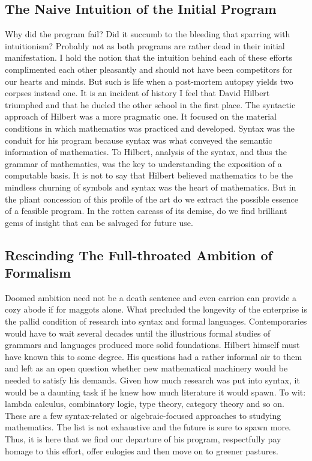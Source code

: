 \subsection{The Naive Intuition of the Initial Program}
Why did the program fail? Did it succumb to the bleeding that sparring with
intuitionism? Probably not as both programs are rather dead in their initial
manifestation. I hold the notion that the intuition behind each of these
efforts complimented each other pleasantly and should not have been competitors
for our hearts and minds. But such is life when a post-mortem autopsy yields
two corpses instead one. It is an incident of history I feel that David Hilbert
triumphed and that he dueled the other school in the first place. The syntactic
approach of Hilbert was a more pragmatic one. It focused on the material
conditions in which mathematics was practiced and developed. Syntax was the
conduit for his program because syntax was what conveyed the semantic
information of mathematics. To Hilbert, analysis of the syntax, and thus the
grammar of mathematics, was the key to understanding the exposition of a
computable basis. It is not to say that Hilbert believed mathematics to be the
mindless churning of symbols and syntax was the heart of mathematics. But in
the pliant concession of this profile of the art do we extract the possible
essence of a feasible program. In the rotten carcass of its demise, do we find
brilliant gems of insight that can be salvaged for future use.

\subsection{Rescinding The Full-throated Ambition of Formalism}
Doomed ambition need not be a death sentence and even carrion can provide a
cozy abode if for maggots alone. What precluded the longevity of the enterprise
is the pallid condition of research into syntax and formal languages.
Contemporaries would have to wait several decades until the illustrious formal
studies of grammars and languages produced more solid foundations. Hilbert
himself must have known this to some degree. His questions had a rather
informal air to them and left as an open question whether new mathematical
machinery would be needed to satisfy his demands. Given how much research was
put into syntax, it would be a daunting task if he knew how much literature it
would spawn. To wit: lambda calculus, combinatory logic, type theory, category
theory and so on. These are a few syntax-related or algebraic-focused
approaches to studying mathematics. The list is not exhaustive and the future
is sure to spawn more. Thus, it is here that we find our departure of his
program, respectfully pay homage to this effort, offer eulogies and then move
on to greener pastures.

